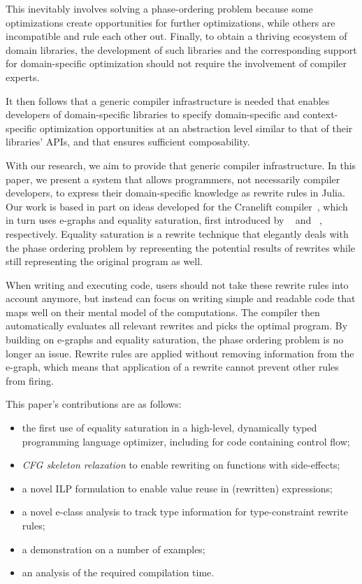 This inevitably involves solving a phase-ordering problem because some optimizations create opportunities for further optimizations, while others are incompatible and rule each other out.
Finally, to obtain a thriving ecosystem of domain libraries, the development of such libraries and the corresponding support for domain-specific optimization should not require the involvement of compiler experts. 

It then follows that a generic compiler infrastructure is needed that enables developers of domain-specific libraries to specify domain-specific and context-specific optimization opportunities at an abstraction level similar to that of their libraries' APIs, and that ensures sufficient composability. 

With our research, we aim to provide that generic compiler infrastructure. In this paper, we present a system that allows programmers, not necessarily compiler developers, to express their domain-specific knowledge as rewrite rules in Julia.
Our work is based in part on ideas developed for the Cranelift compiler~\cite{fallinAegraphsAcyclicEgraphs2023}, which in turn uses e-graphs and equality saturation, first introduced by \citeauthor{nelsonTechniquesProgramVerification1979}~\cite{nelsonTechniquesProgramVerification1979} and \citeauthor{tateEqualitySaturationNew2009}~\cite{tateEqualitySaturationNew2009}, respectively.
Equality saturation is a rewrite technique that elegantly deals with the phase ordering problem by representing the potential results of rewrites while still representing the original program as well.

When writing and executing code, users should not take these rewrite rules into account anymore, but instead can focus on writing simple and readable code that maps well on their mental model of the computations. The compiler then automatically evaluates all relevant rewrites and picks the optimal program. By building on e-graphs and equality saturation, the phase ordering problem is no longer an issue.
Rewrite rules are applied without removing information from the e-graph, which means that application of a rewrite cannot prevent other rules from firing.

This paper's contributions are as follows:
\begin{itemize}
\item the first use of equality saturation in a high-level, dynamically typed programming language optimizer, including for code containing control flow;
\item \emph{CFG skeleton relaxation} to enable rewriting on functions with side-effects; 
\item a novel ILP formulation to enable value reuse in (rewritten) expressions; 
\item a novel e-class analysis to track type information for type-constraint rewrite rules;
\item a demonstration on a number of examples; 
\item an analysis of the required compilation time.
\end{itemize}


